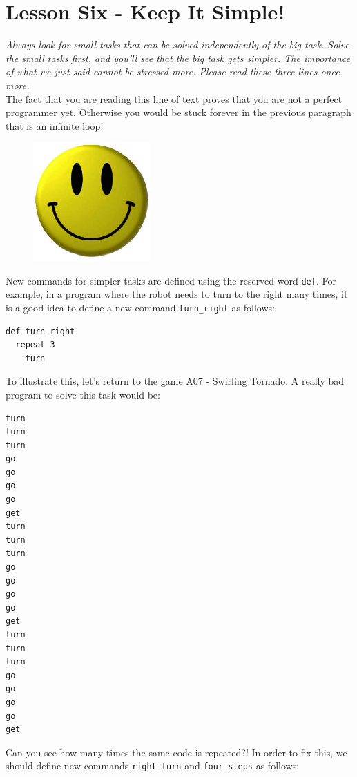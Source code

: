 \documentclass[article,A4,12pt]{llncs}
\begin{document}
\section{Lesson Six - Keep It Simple!}

\begin{center}
{}
\end{center}

\noindent
{\em Always look for small tasks that can be solved independently of the big task.
Solve the small tasks first, and you'll
see that the big task gets simpler. The importance of what we
just said cannot be stressed more. Please read these three lines 
once more.}\\

\noindent
The fact that you are reading this line of text proves that you are not 
a perfect programmer yet. Otherwise you would be stuck forever in the 
previous paragraph that is an infinite loop!

\begin{figure}[!ht]
\begin{center}
\includegraphics[width=0.4\textwidth]{img/smiley.png}
\end{center}
\end{figure}

\newpage

\noindent
New commands for simpler tasks are defined using the reserved word 
{\tt def}. For example, in a program where the robot needs to turn to the 
right many times, it is a good idea to define a new command {\tt turn\_right}
as follows:

\begin{verbatim}
def turn_right
  repeat 3
    turn
\end{verbatim}
To illustrate this, let's return to the game A07 - Swirling Tornado.
A really bad program to solve this task would be:

{\small
\begin{verbatim}
turn
turn
turn
go
go
go
go 
get
turn
turn
turn
go
go
go
go 
get
turn
turn
turn
go
go
go
go
get
\end{verbatim}
}
\noindent
Can you see how many times the same code is repeated?! In order to fix this, 
we should define new commands {\tt right\_turn} and {\tt four\_steps} as
follows:
\end{document}
